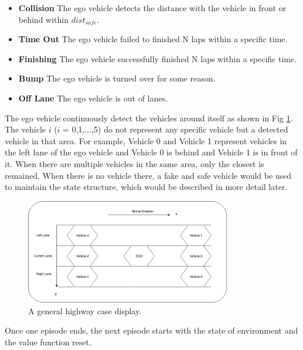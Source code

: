 \begin{itemize}

\item \textbf{Collision} The ego vehicle detects the distance with the vehicle in front or behind within $dist_{safe}$.

\item \textbf{Time Out} The ego vehicle failed to finished N laps within a specific time.

\item \textbf{Finishing} The ego vehicle successfully finished N laps within a specific time.

\item \textbf{Bump} The ego vehicle is turned over for some reason.

\item \textbf{Off Lane} The ego vehicle is out of lanes.

\end{itemize}

The ego vehicle continuously detect the vehicles around itself as shown in Fig \ref{fig:highway}. The vehicle $i$ ($i$ = 0,1,...,5) do not represent any specific vehicle but a detected vehicle in that area. For example, Vehicle 0 and Vehicle 1 represent vehicles in the left lane of the ego vehicle and Vehicle 0 is behind and Vehicle 1 is in front of it. When there are multiple vehicles in the same area, only the closest is remained. When there is no vehicle there, a fake and safe vehicle would be used to maintain the state structure, which would be described in more detail later.

\begin{figure}[h]
\centering
\includegraphics[width=0.8\textwidth]{figs/ch4/Highway-Display}
\caption{A general highway case display.}
\label{fig:highway}
\end{figure}

Once one episode ends, the next episode starts with the state of environment and the value function reset.


